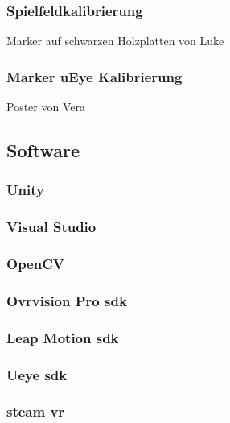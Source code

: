 \subsubsection{Spielfeldkalibrierung}
Marker auf schwarzen Holzplatten von Luke

\subsubsection{Marker uEye Kalibrierung}
Poster von Vera

\subsection{Software}
\subsubsection{Unity \label{unity}}
\subsubsection{Visual Studio}
\subsubsection{OpenCV}

\subsubsection{Ovrvision Pro sdk}
\subsubsection{Leap Motion sdk}
\subsubsection{Ueye sdk}
\subsubsection{steam vr}


\newpage